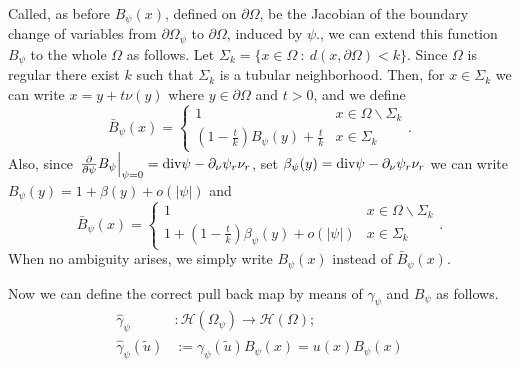 \documentclass[a4paper,reqno,11pt,oneside]{amsart}
\theoremstyle{plain}
\theoremstyle{plain}
\theoremstyle{plain}
\theoremstyle{remark}
\def\div{\textup{div}}
\begin{document}
Called, as before  $B_\psi(x)$, defined on $\partial \Omega$, be   the Jacobian  of the boundary change of variables from $\partial\Omega_\psi $ to $\partial\Omega$, induced by $\psi$., we can extend this function $B_\psi$ to the whole $\Omega$ as follows. 
Let $\Sigma_k=\{x\in \Omega \ :\ d(x,\partial \Omega)<k\}$. Since $\Omega$ is regular there exist $k$ such that $\Sigma_k$ is a tubular neighborhood. Then, for $x\in \Sigma_k$ we can write $x=y+t\nu(y)$ where $y\in\partial\Omega$ and $t>0$, and we define
\begin{equation}
    \bar{B}_\psi(x)=\left\{
    \begin{array}{cc}
    1&x\in \Omega\smallsetminus \Sigma_k\\
  \left(1-\frac tk\right)B_\psi(y)+\frac tk  &x\in \Sigma_k
    \end{array}
    \right. .
\end{equation}
Also, since $\left. \frac{\partial}{\partial \psi}B_\psi \right|_{\psi=0}=\div \psi -  \partial_\nu \psi_r \nu_r$, set $\beta_\psi(y)=\div \psi -  \partial_\nu \psi_r\nu_r$ we can write ${B}_\psi(y)=1+\beta(y)+o(|\psi|)$ and
\begin{equation}
   \bar{B}_\psi(x)=\left\{
    \begin{array}{cc}
    1&x\in \Omega\smallsetminus \Sigma_k\\
  1+\left(1-\frac tk\right)\beta_\psi(y)+o(|\psi|)  &x\in \Sigma_k
    \end{array}
    \right. .
\end{equation}
When no ambiguity arises, we simply write ${B}_\psi(x)$ instead of $ \bar{B}_\psi(x)$.

Now we can define the correct pull back map by means of $\gamma_\psi$ and  $B_\psi$ as follows.
\begin{align*}
\hat\gamma_\psi&:\mathcal{H}(\Omega_\psi)\rightarrow \mathcal{H}(\Omega);\\
\hat\gamma_\psi(\tilde{u})&:=\gamma_\psi(\tilde{u})B_\psi(x)=u(x)B_\psi(x)
\end{align*}
\end{document}
